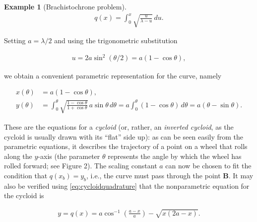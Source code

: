 \documentclass[11pt]{report}
\theoremstyle{plain}
\theoremstyle{definition}
\newtheorem{example}[thm]{Example}
\begin{document}
\begin{example}[Brachistochrone problem]
\begin{equation*} \tag{16}\label{eq:cycloidquadrature}
\begin{split}
q(x) = \int_0^x \sqrt{\frac{u}{\lambda-u}}\,du.
\end{split}
\end{equation*}

\noindent Setting $a=\lambda/2$ and using the trigonometric
substitution

\begin{align*}
u = 2a \sin^2(\theta/2) = a(1-\cos \theta),
\end{align*}

\noindent we obtain a convenient parametric representation for
the curve, namely

\begin{align*}
x(\theta) &= a(1-\cos \theta), \\
y(\theta) &= \int_0^\theta \sqrt{\frac{1-\cos\theta}{1+\cos\theta}}\,a\sin \theta\,d\theta
= a\int_0^\theta (1-\cos\theta)\,d\theta = a(\theta-\sin\theta).
\end{align*}

\noindent These are the equations for a \emph{cycloid} (or, rather,
an \emph{inverted cycloid}, as the cycloid is usually drawn
with its ``flat'' side up): as can be seen easily from
the parametric equations, it describes the trajectory
of a point on a wheel that rolls along the $y$-axis
(the parameter $\theta$ represents the angle by which
the wheel has rolled forward; see Figure 2). The
scaling constant $a$ can now be chosen to fit the
condition that $q(x_b)=y_b$, i.e., the curve must pass
through the point $\mathbf{B}$. It may also be
verified using \eqref{eq:cycloidquadrature} that the
nonparametric equation for the cycloid is

\begin{align*}
y = q(x) = a \cos^{-1}\left(\frac{a-x}{a}\right)-\sqrt{x(2a-x)}.
\end{align*}

\end{example}
\end{document}
